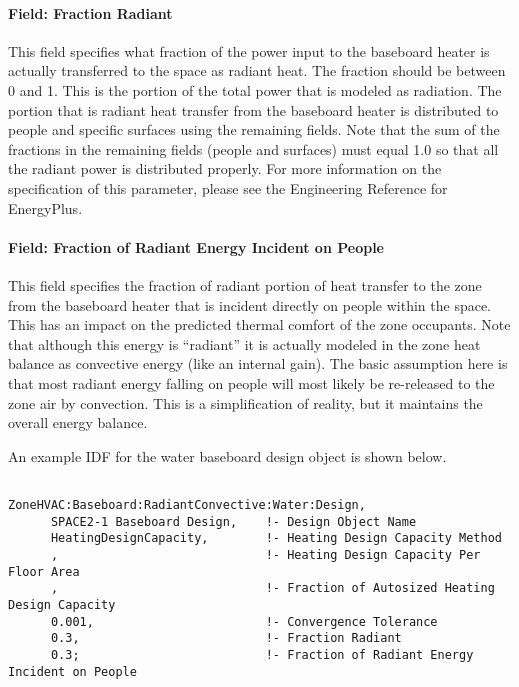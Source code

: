 \paragraph{Field: Fraction Radiant}\label{field-fraction-radiant-000}

This field specifies what fraction of the power input to the baseboard heater is actually transferred to the space as radiant heat. The fraction should be between 0 and 1. This is the portion of the total power that is modeled as radiation. The portion that is radiant heat transfer from the baseboard heater is distributed to people and specific surfaces using the remaining fields. Note that the sum of the fractions in the remaining fields (people and surfaces) must equal 1.0 so that all the radiant power is distributed properly. For more information on the specification of this parameter, please see the Engineering Reference for EnergyPlus.

\paragraph{Field: Fraction of Radiant Energy Incident on People}\label{field-fraction-of-radiant-energy-incident-on-people}

This field specifies the fraction of radiant portion of heat transfer to the zone from the baseboard heater that is incident directly on people within the space. This has an impact on the predicted thermal comfort of the zone occupants. Note that although this energy is ``radiant'' it is actually modeled in the zone heat balance as convective energy (like an internal gain). The basic assumption here is that most radiant energy falling on people will most likely be re-released to the zone air by convection. This is a simplification of reality, but it maintains the overall energy balance.

An example IDF for the water baseboard design object is shown below.

\begin{lstlisting}

ZoneHVAC:Baseboard:RadiantConvective:Water:Design,
      SPACE2-1 Baseboard Design,    !- Design Object Name
      HeatingDesignCapacity,        !- Heating Design Capacity Method
      ,                             !- Heating Design Capacity Per Floor Area
      ,                             !- Fraction of Autosized Heating Design Capacity
      0.001,                        !- Convergence Tolerance
      0.3,                          !- Fraction Radiant
      0.3;                          !- Fraction of Radiant Energy Incident on People

\end{lstlisting}

